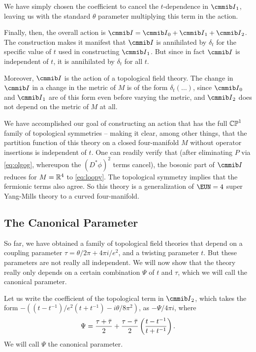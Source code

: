 We have simply chosen the coefficient to cancel the $t$-dependence
in ${{\cmmib I}}_1$, leaving us with the standard $\theta$
parameter multiplying this term in the action.

Finally, then, the overall  action is ${{\cmmib I}}={\cmmib
I}_0+{{\cmmib I}}_1+{{\cmmib I}}_2$. The construction makes it
manifest that ${{\cmmib I}}$ is annihilated by $\delta_t$ for the
specific value of $t$ used in constructing ${{\cmmib I}}_1$.  But
since in fact ${{\cmmib I}}$ is independent of $t$,
it is annihilated by $\delta_t$ for all $t$.

Moreover, ${{\cmmib I}}$ is the action of a topological field
theory. The change in ${{\cmmib I}}$ in a change in the metric of
$M$ is of the form $\delta_t(\dots)$, since ${{\cmmib I}}_0$ and
${{\cmmib I}}_1$ are of this form even before varying the metric,
and ${{\cmmib I}}_2$ does not depend on the metric of $M$ at all.

We have accomplished our goal of constructing an action that has
the full ${\Bbb{ CP}}^1$ family of topological symmetries --
making it clear, among other things, that the partition function
of this theory on a closed four-manifold $M$ without operator
insertions is independent of $t$.  One can readily verify that
(after eliminating $P$ via \eqref{eq:olgog}, whereupon the $(D^*\phi)^2$
terms cancel), the bosonic part of ${{\cmmib I}}$ reduces for
$M=\Bbb{R}^4$ to \eqref{eq:loopy}.  The topological symmetry implies that
the fermionic terms also agree. So this theory is a generalization
of ${\EUN}=4$ super Yang-Mills theory to a curved four-manifold.

\subsection{The Canonical Parameter}

\label{sec:canonpar}

So far, we have obtained a family of topological field theories
that depend on a coupling parameter $\tau=\theta/2\pi+4\pi i/e^2$,
and a twisting parameter $t$.  But these parameters are not really
all independent.  We will now show that the theory really only
depends on a certain combination $\Psi$ of $t$ and $\tau$, which
we will call the canonical parameter.

Let us write the coefficient of the topological term in ${\cmmib
I}_2$, which takes the form $-\left({(t-t^{-1})/
e^2(t+t^{-1})}-i{\theta/8\pi^2}\right)$, as $-\Psi/4\pi i$, where
\setcounter{equation}{49}
\begin{equation}\label{eq:yorgo}
\Psi = {\tau+\bar\tau\over 2}+{\tau-\bar\tau\over
2}\left({t-t^{-1}\over t+t^{-1}}\right).
\end{equation}
 We will call $\Psi$ the
canonical parameter.

